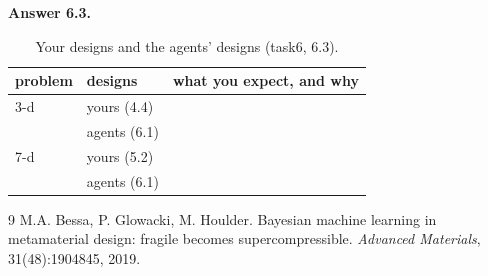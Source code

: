 \documentclass[11pt]{article}
\newcommand{\ans}[1]{\textbf{Answer #1.}}            %
\newcommand{\nb}[2]{{\small(task#1, #2)}}            %
\begin{document}
\ans{6.3} %

\begin{table}[htb]\centering\small
\caption{Your designs and the agents' designs \nb{6}{6.3}.}
\begin{tabular}{@{}lll@{}}\toprule
problem & designs & what you expect, and why\\\midrule
3-d & yours (4.4) & \\
 & agents (6.1) & \\\midrule
7-d & yours (5.2) & \\
 & agents (6.1) & \\\bottomrule
\end{tabular}
\end{table}

\begin{thebibliography}{9}\small
{} M.A. Bessa, P. Glowacki, M. Houlder. Bayesian machine learning in metamaterial design: fragile becomes supercompressible. \emph{Advanced Materials}, 31(48):1904845, 2019.
\end{thebibliography}
\end{document}
